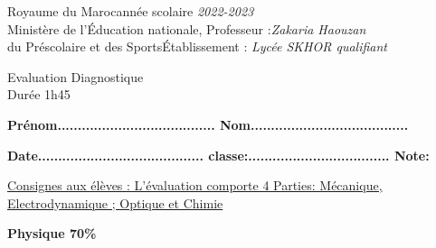\documentclass[12pt]{article}
\newcommand\headerMe[2]{\noindent{}#1\hfill#2}
\begin{document}
\headerMe{Royaume du Maroc}{année scolaire \emph{2022-2023}}\\
\headerMe{Ministère de l'Éducation nationale, }{  Professeur :\emph{Zakaria Haouzan}}\\
\headerMe{du Préscolaire et des Sports}{Établissement : \emph{Lycée SKHOR qualifiant}}\\
\begin{center}
	\vspace{-0.5cm}
Evaluation Diagnostique \\
Durée 1h45
\\
\end{center}
\begin{center}
	\vspace{-0.2cm}
	\textbf{ Prénom.......................................  Nom.......................................}
	
	\vspace{0.5cm}
	\textbf{ Date.........................................  classe:................................... Note: }
		



\end{center}
\begin{center}

	\vspace{-0.75cm}
\underline{Consignes aux élèves : L’évaluation comporte 4 Parties: Mécanique, Electrodynamique ; Optique et Chimie}

	\hrulefill
\textbf{Physique 70\%}
\hrulefill
\end{center}
\end{document}
